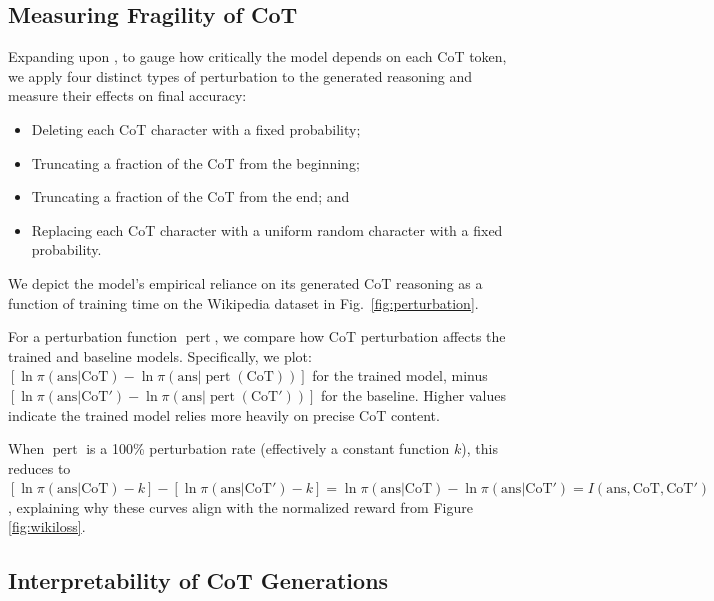 \documentclass{article}
\theoremstyle{plain}
\theoremstyle{definition}
\theoremstyle{remark}
\begin{document}
\subsection{Measuring Fragility of CoT}\label{subsec:fragile}

Expanding upon \citet{lanham2023measuring}, to gauge how critically the model depends on each CoT token, we apply four distinct types of perturbation to the generated reasoning and measure their effects on final accuracy:
\begin{itemize}
    \item Deleting each CoT character with a fixed probability;
    \item Truncating a fraction of the CoT from the beginning;
    \item Truncating a fraction of the CoT from the end; and
    \item Replacing each CoT character with a uniform random character with a fixed probability.
\end{itemize}

We depict the model's empirical reliance on its generated CoT reasoning as a function of training time on the Wikipedia dataset in Fig.~\ref{fig:perturbation}. 

For a perturbation function $\operatorname{pert}$, we compare how CoT perturbation affects the trained and baseline models. Specifically, we plot:
$[\ln \pi(\text{ans}|\text{CoT}) - \ln \pi(\text{ans}|\operatorname{pert}(\text{CoT}))]$ for the trained model, minus
$[\ln \pi(\text{ans}|\text{CoT}') - \ln \pi(\text{ans}|\operatorname{pert}(\text{CoT}'))]$ for the baseline.
Higher values indicate the trained model relies more heavily on precise CoT content.

When $\operatorname{pert}$ is a 100\% perturbation rate (effectively a constant function $k$), this reduces to 
$[\ln \pi(\text{ans}|\text{CoT}) - k] - [\ln \pi(\text{ans}|\text{CoT}') - k] = \ln \pi(\text{ans}|\text{CoT}) - \ln \pi(\text{ans}|\text{CoT}') = I(\text{ans}, \text{CoT}, \text{CoT}')$, explaining why these curves align with the normalized reward from Figure \ref{fig:wikiloss}.

\subsection{Interpretability of CoT Generations}
\label{subsec:interp}
\end{document}
